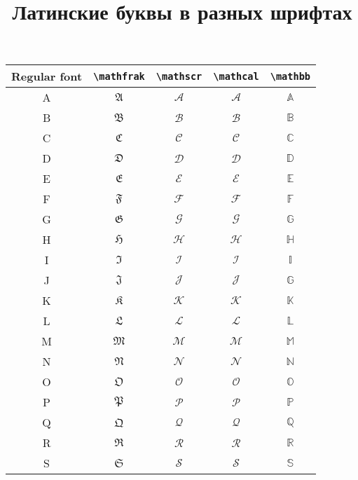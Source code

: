 \documentclass[a4paper,12pt]{article}
\author{}
\title{Латинские буквы в разных шрифтах}
\date{}
\theoremstyle{plain} %
\theoremstyle{definition} %
\theoremstyle{remark} %
\begin{document}
\maketitle

\begin{tabular}{|c|c|c|c|c|}
\hline
Regular font & \verb"\mathfrak" & \verb"\mathscr" & \verb"\mathcal" &  \verb"\mathbb" \\
\hline 
A & $\mathfrak{A}$ & $\mathscr{A}$ & $\mathcal{A}$ & $\mathbb{A}$ \\ 
\hline 
B & $\mathfrak{B}$ & $\mathscr{B}$ & $\mathcal{B}$ & $\mathbb{B}$ \\ 
\hline 
C & $\mathfrak{C}$ & $\mathscr{C}$ & $\mathcal{C}$ & $\mathbb{C}$ \\ 
\hline 
D & $\mathfrak{D}$ & $\mathscr{D}$ & $\mathcal{D}$ & $\mathbb{D}$ \\ 
\hline 
E & $\mathfrak{E}$ & $\mathscr{E}$ & $\mathcal{E}$ & $\mathbb{E}$ \\ 
\hline 
F & $\mathfrak{F}$ & $\mathscr{F}$ & $\mathcal{F}$ & $\mathbb{F}$ \\ 
\hline 
G & $\mathfrak{G}$ & $\mathscr{G}$ & $\mathcal{G}$ &  $\mathbb{G}$ \\ 
\hline 
H & $\mathfrak{H}$ & $\mathscr{H}$ & $\mathcal{H}$ &  $\mathbb{H}$ \\ 
\hline 
I & $\mathfrak{I}$ & $\mathscr{I}$ & $\mathcal{I}$ &  $\mathbb{I}$ \\ 
\hline 
J & $\mathfrak{J}$ & $\mathscr{J}$ & $\mathcal{J}$ &  $\mathbb{G}$ \\ 
\hline 
K & $\mathfrak{K}$ & $\mathscr{K}$ & $\mathcal{K}$ &  $\mathbb{K}$ \\ 
\hline 
L & $\mathfrak{L}$ & $\mathscr{L}$ & $\mathcal{L}$ &  $\mathbb{L}$ \\ 
\hline 
M & $\mathfrak{M}$ & $\mathscr{M}$ & $\mathcal{M}$ &  $\mathbb{M}$ \\ 
\hline 
N & $\mathfrak{N}$ & $\mathscr{N}$ & $\mathcal{N}$ &  $\mathbb{N}$ \\ 
\hline 
O & $\mathfrak{O}$ & $\mathscr{O}$ & $\mathcal{O}$ &  $\mathbb{O}$ \\ 
\hline 
P & $\mathfrak{P}$ & $\mathscr{P}$ & $\mathcal{P}$ &  $\mathbb{P}$ \\ 
\hline 
Q & $\mathfrak{Q}$ & $\mathscr{Q}$ & $\mathcal{Q}$ &  $\mathbb{Q}$ \\ 
\hline 
R & $\mathfrak{R}$ & $\mathscr{R}$ & $\mathcal{R}$ &  $\mathbb{R}$ \\ 
\hline 
S & $\mathfrak{S}$ & $\mathscr{S}$ & $\mathcal{S}$ &  $\mathbb{S}$ \\ 

\end{tabular}
\end{document}
